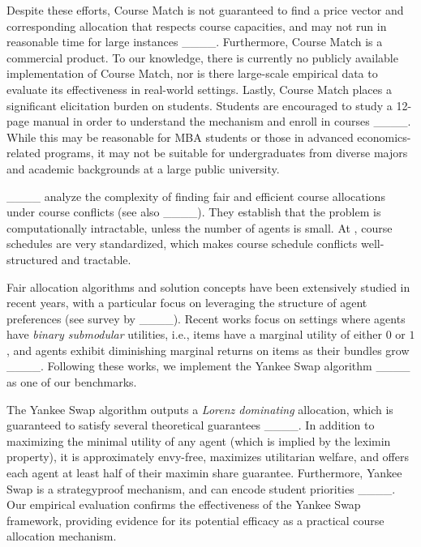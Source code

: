 Despite these efforts, Course Match is not guaranteed to find a price vector and corresponding allocation that respects course capacities, and may not run in reasonable time for large instances ____. 
Furthermore, Course Match is a commercial product. 
To our knowledge, there is currently no publicly available implementation of Course Match, nor is there large-scale empirical data to evaluate its effectiveness in real-world settings. 
Lastly, Course Match places a significant elicitation burden on students. 
Students are encouraged to study a 12-page manual in order to understand the mechanism and enroll in courses ____. 
While this may be reasonable for MBA students or those in advanced economics-related programs, it may not be suitable for undergraduates from diverse majors and academic backgrounds at a large public university. 

____ analyze the complexity of finding fair and efficient course allocations under course conflicts (see also ____). They establish that the problem is computationally intractable, unless the number of agents is small. At \UMass, course schedules are very standardized, which makes course schedule conflicts well-structured and tractable. 

Fair allocation algorithms and solution concepts have been extensively studied in recent years, with a particular focus on leveraging the structure of agent preferences (see survey by ____). 
Recent works focus on settings where agents have \emph{binary submodular} utilities, i.e., items have a marginal utility of either $0$ or $1$, and agents exhibit diminishing marginal returns on items as their bundles grow ____.
Following these works, we implement the Yankee Swap algorithm ____ as one of our benchmarks. 

The Yankee Swap algorithm outputs a \emph{Lorenz dominating} allocation, which is guaranteed to satisfy several theoretical guarantees ____. In addition to maximizing the minimal utility of any agent (which is implied by the leximin property), it is approximately envy-free, maximizes utilitarian welfare, and offers each agent at least half of their maximin share guarantee. Furthermore, Yankee Swap is a strategyproof mechanism, and can encode student priorities ____. Our empirical evaluation confirms the effectiveness of the Yankee Swap framework, providing evidence for its potential efficacy as a practical course allocation mechanism.
